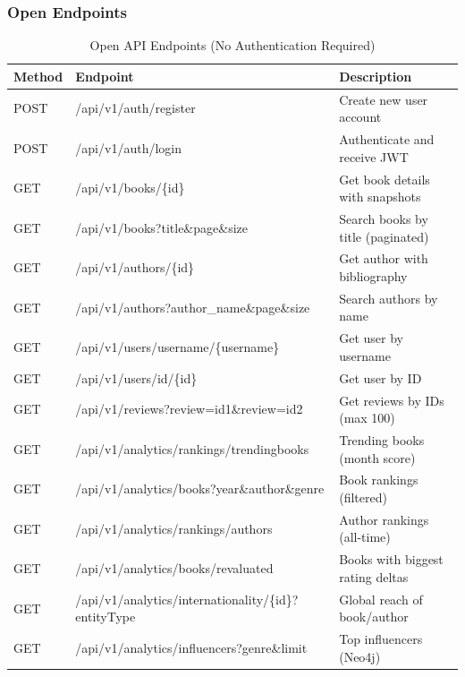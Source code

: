 \subsubsection{Open Endpoints}
\begin{table}[H]
    \centering
    \caption{Open API Endpoints (No Authentication Required)}
    \label{tab:open_endpoints}
    \begin{tabular}{@{}p{}p{}p{}@{}}
        \toprule
        \textbf{Method} & \textbf{Endpoint} & \textbf{Description} \\ \midrule
        POST & /api/v1/auth/register & Create new user account \\
        POST & /api/v1/auth/login & Authenticate and receive JWT \\
        GET & /api/v1/books/\{id\} & Get book details with snapshots \\
        GET & /api/v1/books?title\&page\&size & Search books by title (paginated) \\
        GET & /api/v1/authors/\{id\} & Get author with bibliography \\
        GET & /api/v1/authors?author\_name\&page\&size & Search authors by name \\
        GET & /api/v1/users/username/\{username\} & Get user by username \\
        GET & /api/v1/users/id/\{id\} & Get user by ID \\
        GET & /api/v1/reviews?review=id1\&review=id2 & Get reviews by IDs (max 100) \\
        GET & /api/v1/analytics/rankings/trendingbooks & Trending books (month score) \\
        GET & /api/v1/analytics/books?year\&author\&genre & Book rankings (filtered) \\
        GET & /api/v1/analytics/rankings/authors & Author rankings (all-time) \\
        GET & /api/v1/analytics/books/revaluated & Books with biggest rating deltas \\
        GET & /api/v1/analytics/internationality/\{id\}?entityType & Global reach of book/author \\
        GET & /api/v1/analytics/influencers?genre\&limit & Top influencers (Neo4j) \\
        \bottomrule
    \end{tabular}
\end{table}

